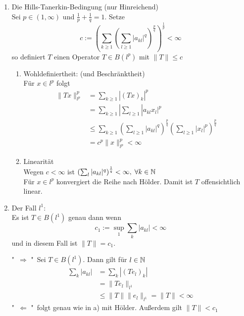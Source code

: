 \begin{beispiel}[Matrizenmultiplikation]
 \begin{enumerate}[label=\alph*\upshape)]
	\item Die Hills-Tanerkin-Bedingung (nur Hinreichend) \\
		Sei $p \in (1, \infty)$ und $\frac{1}{p} + \frac{1}{q} = 1$. Setze
		\[ c := \left( \sum_{k \geq 1} \left( \sum_{l \geq 1} |a_{kl}|^{q} \right)^{\frac{p}{q}} \right)^{\frac{1}{p}} < \infty \]
		so definiert $T$ einen Operator $T \in B(l^{p})$ mit $\| T \| \leq c$ 
		\begin{beweis}
			\begin{enumerate}
				\item Wohldefiniertheit: (und Beschränktheit)  \\
					Für $x \in l^{p}$ folgt
					\begin{align*}
						\| Tx \|_{l^{p}}^{p} &= \sum_{k \geq 1} | (Tx)_{k} |^{p} \\
									 	 &= \sum_{k \geq 1} | \sum_{l \geq 1} |a_{kl} x_{l} |^{p} \\
										 &\leq \sum_{k \geq 1} \left( \sum_{l \geq 1} |a_{kl}|^{q} \right)^{\frac{p}{q}} \left( \sum_{l \geq 1} |x_{l}|^{p} \right)^{\frac{p}{q}} \\
										 &= c^{p} \|x\|_{l^{p}}^{p} < \infty
					\end{align*}
				\item Linearität \\
					Wegen $c < \infty$ ist $\left( \sum_{l} |a_{kl}|^{q} \right)^{\frac{1}{q}} < \infty, \hspace{0.1cm} \forall k \in \mathbb{N}$ \\
					Für $x \in l^{p}$ konvergiert die Reihe nach Hölder. Damit ist $T$ offensichtlich linear.
			\end{enumerate}
		\end{beweis}
	\item Der Fall $l^{1}$: \\
		Es ist $T \in B(l^{1})$ genau dann wenn 
		\[ c_{1} := \sup_{1} \sum_{k} | a_{kl} | < \infty \]
		und in diesem Fall ist $\| T \| = c_{1}$.
		\begin{beweis}
			"\ $\Rightarrow$ "\  Sei $T \in B(l^{1})$. Dann gilt für $l \in \mathbb{N}$
			\begin{align*}
				\sum_{k} | a_{kl} | &= \sum_{k} |(Te_{l})_{k}| \\
								  	&= \| T e_{l} \|_{l^{1}}  \\
								  	& \leq \| T \| \| e_{l} \|_{l^1} = \| T \| < \infty 
			\end{align*}
			"\ $\Leftarrow$ "\  folgt genau wie in a) mit Hölder. Au{\ss}erdem gilt $\| T \| < c_{1}$			

\end{beweis}
\end{enumerate}
\end{beispiel}
